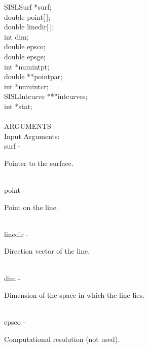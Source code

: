                 \>\>    SISLSurf        \>      *{\fov surf};\\
                \>\>    double  \>      {\fov point}[\,];\\
                \>\>    double  \>      {\fov linedir}[\,];\\
                \>\>    int     \>      {\fov dim};\\
                \>\>    double  \>      {\fov epsco};\\
                \>\>    double  \>      {\fov epsge};\\
                \>\>    int     \>      *{\fov numintpt};\\
                \>\>    double  \>      **{\fov pointpar};\\
                \>\>    int     \>      *{\fov numintcr};\\
                \>\>    SISLIntcurve\>  ***{\fov intcurves};\\
                \>\>    int     \>      *{\fov stat};\\
\\
ARGUMENTS\\
        \>Input Arguments:\\
        \>\>    {\fov surf}     \> - \> \begin{minipg2}
                                Pointer to the surface.
                                \end{minipg2}\\
        \>\>    {\fov point}    \> - \> \begin{minipg2}
                                Point on the line.
                                \end{minipg2}\\
        \>\>    {\fov linedir}  \> - \> \begin{minipg2}
                                Direction vector of the line.
                                \end{minipg2}\\
        \>\>    {\fov dim}      \> - \> \begin{minipg2}
                                Dimension of the space in which the line lies.
                                \end{minipg2}\\
        \>\>    {\fov epsco}    \> - \> \begin{minipg2}
                                Computational resolution (not used).
                                \end{minipg2}\\
